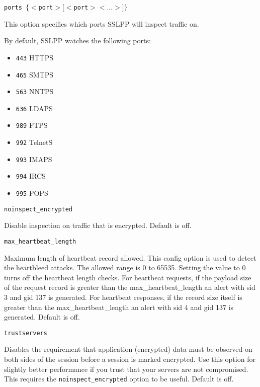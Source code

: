 \documentclass[english]{report}
\newcounter{slistnum}
\newenvironment{slist}
{ \begin{list}{ {\bf \arabic{slistnum}.} }{\usecounter{slistnum} } }
{ \end{list} }
\begin{document}
\begin{slist}

\item \texttt{ports $\{ <$port$> [<$port$> <...>] \}$}

This option specifies which ports SSLPP will inspect traffic on.

By default, SSLPP watches the following ports:
    
\begin{itemize}
    \item \texttt{443}     HTTPS   
    \item \texttt{465}     SMTPS   
    \item \texttt{563}     NNTPS                                                                
    \item \texttt{636}     LDAPS
    \item \texttt{989}     FTPS
    \item \texttt{992}     TelnetS  
    \item \texttt{993}     IMAPS                 
    \item \texttt{994}     IRCS
    \item \texttt{995}     POPS
\end{itemize}

\item \texttt{noinspect\_encrypted}

Disable inspection on traffic that is encrypted.  Default is off.

\item \texttt{max\_heartbeat\_length}

Maximum length of heartbeat record allowed.  This config option is 
used to detect the heartbleed attacks.  The allowed range is 0 to 65535. 
Setting the value to 0 turns off the heartbeat length checks. For heartbeat 
requests, if the payload size of the request record is greater than the 
max\_heartbeat\_length an alert with sid 3 and gid 137 is generated.  
For heartbeat responses, if the record size itself is greater than 
the max\_heartbeat\_length an alert with sid 4 and gid 137 is generated. Default
is off.

\item \texttt{trustservers}

Disables the requirement that application (encrypted) data must be observed on
both sides of the session before a session is marked encrypted.  Use this
option for slightly better performance if you trust that your servers are not
compromised.  This requires the \texttt{noinspect\_encrypted} option to be
useful.  Default is off.  \end{slist}
\end{document}
